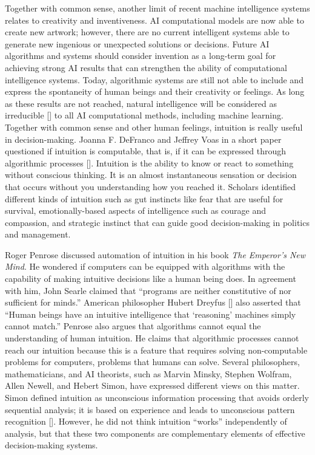 Together with common sense, another limit of recent machine intelligence systems relates to creativity and inventiveness. AI computational models are now able to create new artwork; however, there are no current intelligent systems able to generate new ingenious or unexpected solutions or decisions. Future AI algorithms and systems should consider invention as a long-term goal for achieving strong AI results that can strengthen the ability of computational intelligence systems. Today, algorithmic systems are still not able to include and express the spontaneity of human beings and their creativity or feelings. As long as these results are not reached, natural intelligence will be considered as \hbox{irreducible} [\citealt{chap:11:Faggin:2022}] to all AI computational methods, including machine learning. Together with common sense and other human feelings, intuition is really useful in \hbox{decision-making}. Joanna F. DeFranco and Jeffrey Voas in a short paper questioned if intuition is computable, that is, if it can be expressed through algorithmic processes [\citealt{chap:11:DeFrancoandVoas:2023}]. Intuition is the ability to know or react to something without conscious thinking. It is an almost instantaneous sensation or decision that occurs without you understanding how you reached it. Scholars identified different kinds of intuition such as gut instincts like fear that are useful for survival, emotionally-based aspects of intelligence such as courage and compassion, and strategic instinct that can guide good decision-making in politics and management.

Roger Penrose discussed automation of intuition in his book \textit{The Emperor's New Mind}. He wondered if computers can be equipped with algorithms with the capability of making intuitive decisions like a human being does. In agreement with him, John Searle claimed that ``programs are neither constitutive of nor sufficient for minds.'' American philosopher Hubert Dreyfus [\citealt{chap:11:DreyfusandDreyfus:2009}] also asserted that ``Human beings have an intuitive intelligence that `reasoning' machines simply cannot match.'' Penrose also argues that algorithms cannot equal the understanding of human intuition. He claims that algorithmic processes cannot reach our intuition because this is a feature that requires solving non-computable problems for computers, problems that humans can solve. Several philosophers, mathematicians, and AI theorists, such as Marvin Minsky, Stephen Wolfram, Allen Newell, and Hebert Simon, have expressed different views on this matter. Simon defined intuition as unconscious information processing that avoids orderly sequential analysis; it is based on experience and leads to unconscious pattern recognition [\citealt{chap:11:Simon:1995}]. However, he did not think intuition ``works'' independently of analysis, but that these two components are complementary elements of effective decision-making systems.

